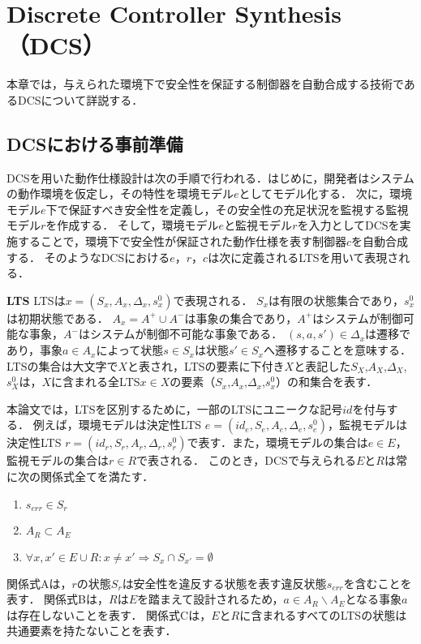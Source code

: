 \section{Discrete Controller Synthesis（DCS）}
\label{section:DCS}
本章では，与えられた環境下で安全性を保証する制御器を自動合成する技術であるDCSについて詳説する．

\subsection{DCSにおける事前準備}
\label{subsection:preparation}
DCSを用いた動作仕様設計は次の手順で行われる．はじめに，開発者はシステムの動作環境を仮定し，その特性を環境モデル$e$としてモデル化する．
次に，環境モデル$e$下で保証すべき安全性を定義し，その安全性の充足状況を監視する監視モデル$r$を作成する．
そして，環境モデル$e$と監視モデル$r$を入力としてDCSを実施することで，環境下で安全性が保証された動作仕様を表す制御器$c$を自動合成する．
そのようなDCSにおける$e$，$r$，$c$は次に定義されるLTS\cite{paper:Concurrency}を用いて表現される．

\begin{dfn}{\textbf{LTS}}
\label{def:{}component_model}
    LTSは$x = (S_{x}, A_{x}, \Delta_{x}, s^0_{x})$で表現される．
    $S_{x}$は有限の状態集合であり，$s^0_{x}$は初期状態である．
    $A_{x} = A^+ \cup A^-$は事象の集合であり，$A^+$はシステムが制御可能な事象，$A^-$はシステムが制御不可能な事象である．
    $(s,a,s') \in \Delta_{x}$は遷移であり，事象$a \in A_{x}$によって状態$s \in S_{x}$は状態$s' \in S_{x}$へ遷移することを意味する．
    LTSの集合は大文字で$X$と表され，LTSの要素に下付き$X$と表記した$S_{X}$,$A_{X}$,$\Delta_{X}$,$s^0_{X}$は，$X$に含まれる全LTS$x \in X$の要素（$S_{x}$,$A_{x}$,$\Delta_{x}$,$s^0_{x}$）の和集合を表す．
\end{dfn}

本論文では，LTSを区別するために，一部のLTSにユニークな記号$id$を付与する．
例えば，環境モデルは決定性LTS $e = (id_{e}, S_{e}, A_{e}, \Delta_{e}, s^0_{e})$，監視モデルは決定性LTS $r = (id_{r}, S_{r}, A_{r}, \Delta_{r}, s^0_{r})$で表す．また，環境モデルの集合は$e \in E$，監視モデルの集合は$r \in R$で表される．
このとき，DCSで与えられる$E$と$R$は常に次の関係式全てを満たす．
\begin{enumerate}[\bf 関係式A]
\item $s_{err} \in S_{r}$
\item $A_{R} \subset A_{E}$
\item $\forall x, x' \in E \cup R:  x \neq x'  \Rightarrow S_x \cap S_{x'} = \emptyset$
\end{enumerate}
関係式Aは，$r$の状態$S_{r}$は安全性を違反する状態を表す違反状態$s_{err}$を含むことを表す．
関係式Bは，$R$は$E$を踏まえて設計されるため，$a \in A_{R} \backslash A_{E}$となる事象$a$は存在しないことを表す．
関係式Cは，$E$と$R$に含まれるすべてのLTSの状態は共通要素を持たないことを表す．

